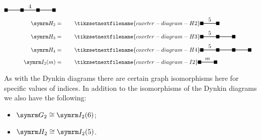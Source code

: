\begin{align}
\begin{tikzpicture}[coxeter node/.style = {fill, inner sep=3pt}, coxeter wire/.style = {thick}]
        \draw [coxeter wire] (0, 0) -- ++ (3, 0);
        \node [coxeter node] at (0, 0) {};
        \node [coxeter node] at (1, 0) {};
        \node [coxeter node] at (2, 0) {};
        \node [coxeter node] at (3, 0) {};
        \node [above] at (1.5, 0) {\(4\)};
    \end{tikzpicture}
    \\
    \H[2] &= \qquad
    \tikzsetnextfilename{coxeter-diagram-H2}
    \begin{tikzpicture}[coxeter node/.style = {fill, inner sep=3pt}, coxeter wire/.style = {thick}]
        \draw [coxeter wire] (0, 0) -- ++ (1, 0);
        \node [above] at (0.5, 0) {\(5\)};
        \node [coxeter node] at (0, 0) {};
        \node [coxeter node] at (1, 0) {};
    \end{tikzpicture}
    \\
    \H[3] &= \qquad
    \tikzsetnextfilename{coxeter-diagram-H3}
    \begin{tikzpicture}[coxeter node/.style = {fill, inner sep=3pt}, coxeter wire/.style = {thick}]
        \draw [coxeter wire] (0, 0) -- ++ (2, 0);
        \node [above] at (0.5, 0) {\(5\)};
        \node [coxeter node] at (0, 0) {};
        \node [coxeter node] at (1, 0) {};
        \node [coxeter node] at (2, 0) {};
    \end{tikzpicture}
    \\
    \H[4] &= \qquad
    \tikzsetnextfilename{coxeter-diagram-H4}
    \begin{tikzpicture}[coxeter node/.style = {fill, inner sep=3pt}, coxeter wire/.style = {thick}]
        \draw [coxeter wire] (0, 0) -- ++ (3, 0);
        \node [above] at (0.5, 0) {\(5\)};
        \node [coxeter node] at (0, 0) {};
        \node [coxeter node] at (1, 0) {};
        \node [coxeter node] at (2, 0) {};
        \node [coxeter node] at (3, 0) {};
    \end{tikzpicture}
    \\
    \I[2][m] &= \qquad
    \tikzsetnextfilename{coxeter-diagram-I2}
    \begin{tikzpicture}[coxeter node/.style = {fill, inner sep=3pt}, coxeter wire/.style = {thick}]
        \draw [coxeter wire] (0, 0) -- ++ (1, 0);
        \node [above] at (0.5, 0) {\(m\)};
        \node [coxeter node] at (0, 0) {};
        \node [coxeter node] at (1, 0) {};
    \end{tikzpicture}
\end{align}
\endgroup

As with the Dynkin diagrams there are certain graph isomorphisms here for specific values of indices.
In addition to the isomorphisms of the Dynkin diagrams we also have the following:
\begin{itemize}
    \item \(\G[2] \isomorphic \I[2][6]\);
    \item \(\H[2] \isomorphic \I[2][5]\).
\end{itemize}

